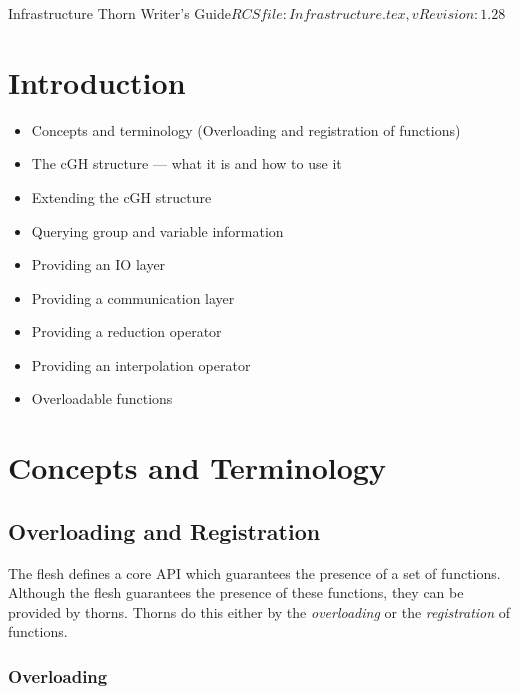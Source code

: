 \begin{cactuspart}{4}{Infrastructure Thorn Writer's Guide}{$RCSfile: Infrastructure.tex,v $}{$Revision: 1.28 $}
\renewcommand{\thepage}{\Alph{part}\arabic{page}}

\chapter{Introduction} 

\begin{itemize}
 \item{} Concepts and terminology (Overloading and registration of functions)
 \item{} The cGH structure --- what it is and how to use it
 \item{} Extending the cGH structure
 \item{} Querying group and variable information
 \item{} Providing an IO layer
 \item{} Providing a communication layer
 \item{} Providing a reduction operator
 \item{} Providing an interpolation operator
 \item{} Overloadable functions
\end{itemize}

\chapter{Concepts and Terminology}
\label{chap:cote}

\section{Overloading and Registration}

The flesh defines a core API which guarantees the presence of a set of 
functions.  Although the flesh guarantees the presence of these functions,
they can be provided by thorns.  Thorns do this either by the {\em overloading} 
or the {\em registration} of functions.

\subsection{Overloading}


\end{cactuspart}
